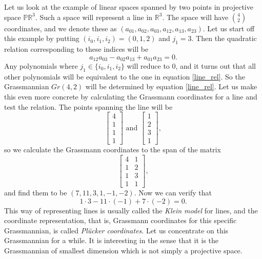 \documentclass[a4paper,12pt]{book}
\theoremstyle{plain}
\theoremstyle{definition}
\begin{document}
Let us look at the example of linear spaces spanned by two
points in projective space \( \mathbb{PR}^3 \).
Such a space will represent a line in \( \mathbb{R}^3 \).
The space will have \( {4 \choose 2} \) coordinates,
and we denote these as \( (a_{01},a_{02},a_{03},a_{12},a_{13},a_{23}) \).
Let us start off this example by putting \( (i_0, i_1, i_2) = (0, 1, 2) \) and \( j_1 = 3 \).
Then the quadratic
relation corresponding to these indices will be
\begin{equation} \label{line_rel}
	a_{12}a_{03} - a_{02}a_{13} + a_{01}a_{23} = 0.
\end{equation}
Any polynomials where \( j_1 \in \{i_0, i_1, i_2\} \) will reduce to \( 0 \),
and it turns out that all
other polynomials will be equivalent to the one in equation \ref{line_rel}.
So the Grassmannian \( Gr (4,2) \) will be determined by equation \ref{line_rel}.
Let us make this even more concrete by calculating the Grassmann
coordinates for a line and test the relation.
The points spanning the line will be
\[
	\begin{bmatrix}
		4 \\ 1 \\ 1 \\ 1
	\end{bmatrix} \text{ and } \begin{bmatrix}
		1 \\ 2 \\ 3 \\1
	\end{bmatrix},
\]
so we calculate the Grassmann coordinates to the span of the matrix
\[
	\begin{bmatrix}
		4 & 1 \\ 1 & 2 \\ 1 & 3 \\ 1 & 1
	\end{bmatrix},
\]
and find them to be \( (7, 11, 3, 1, -1, -2) \). Now we can verify that
\[
	1 \cdot 3 - 11 \cdot (-1) + 7 \cdot (-2) = 0.
\]
This way of representing lines is usually called the \emph{Klein model} for lines,
and the coordinate representation, that is, Grassmann coordinates for this specific
Grassmannian, is called \emph{Pl\"ucker coordinates}. Let us concentrate on this
Grassmannian for a while. It is interesting in the sense that it is the Grassmannian
of smallest dimension which is not simply a projective space.
\end{document}
